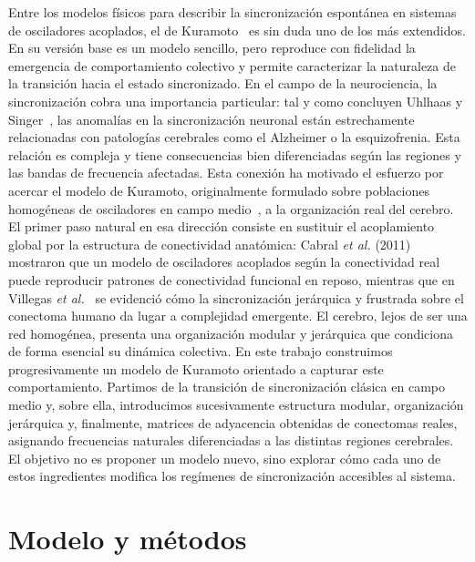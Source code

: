\documentclass[
  reprint,
  amsmath,amssymb,
  aps,
  pra,
]{revtex4-2}
\begin{document}
Entre los modelos físicos para describir la sincronización espontánea en sistemas de osciladores acoplados, el de Kuramoto~\cite{Kuramoto} es sin duda uno de los más extendidos. En su versión base es un modelo sencillo, pero reproduce con fidelidad la emergencia de comportamiento colectivo y permite caracterizar la naturaleza de la transición hacia el estado sincronizado. En el campo de la neurociencia, la sincronización cobra una importancia particular: tal y como concluyen Uhlhaas y Singer~\cite{uhlhaas2006neural}, las anomalías en la sincronización neuronal están estrechamente relacionadas con patologías cerebrales como el Alzheimer o la esquizofrenia. Esta relación es compleja y tiene consecuencias bien diferenciadas según las regiones y las bandas de frecuencia afectadas. Esta conexión ha motivado el esfuerzo por acercar el modelo de Kuramoto, originalmente formulado sobre poblaciones homogéneas de osciladores en campo medio~\cite{acebron2005kuramoto}, a la organización real del cerebro. El primer paso natural en esa dirección consiste en sustituir el acoplamiento global por la estructura de conectividad anatómica: Cabral \textit{et al.} (2011)~\cite{cabral2011role} mostraron que un modelo de osciladores acoplados según la conectividad real puede reproducir patrones de conectividad funcional en reposo, mientras que en Villegas \textit{et al.}~\cite{villegas2014frustrated} se evidenció cómo la sincronización jerárquica y frustrada sobre el conectoma humano da lugar a complejidad emergente. El cerebro, lejos de ser una red homogénea, presenta una organización modular y jerárquica que condiciona de forma esencial su dinámica colectiva. En este trabajo construimos progresivamente un modelo de Kuramoto orientado a capturar este comportamiento. Partimos de la transición de sincronización clásica en campo medio y, sobre ella, introducimos sucesivamente estructura modular, organización jerárquica y, finalmente, matrices de adyacencia obtenidas de conectomas reales, asignando frecuencias naturales diferenciadas a las distintas regiones cerebrales. El objetivo no es proponer un modelo nuevo, sino explorar cómo cada uno de estos ingredientes modifica los regímenes de sincronización accesibles al sistema.\\

\twocolumngrid

\section{Modelo y métodos}
\label{sec:metodos}
\end{document}
